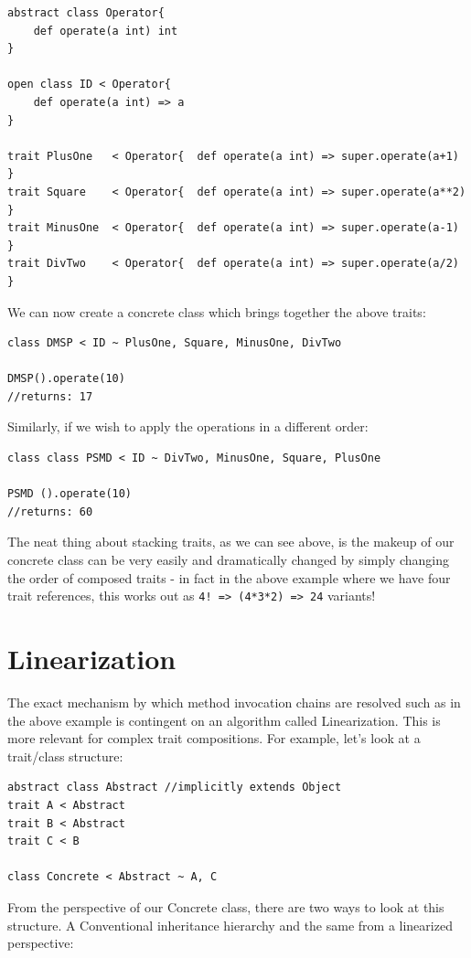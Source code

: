\documentclass[conc-doc]{subfiles}
\begin{document}
\begin{lstlisting}
abstract class Operator{
	def operate(a int) int
}

open class ID < Operator{
	def operate(a int) => a
}

trait PlusOne   < Operator{  def operate(a int) => super.operate(a+1) }
trait Square    < Operator{  def operate(a int) => super.operate(a**2) }
trait MinusOne  < Operator{  def operate(a int) => super.operate(a-1) }
trait DivTwo    < Operator{  def operate(a int) => super.operate(a/2) }
\end{lstlisting}

We can now create a concrete class which brings together the above traits:

\begin{lstlisting}
class DMSP < ID ~ PlusOne, Square, MinusOne, DivTwo

DMSP().operate(10)
//returns: 17
\end{lstlisting}

Similarly, if we wish to apply the operations in a different order:
\begin{lstlisting}
class class PSMD < ID ~ DivTwo, MinusOne, Square, PlusOne

PSMD ().operate(10)
//returns: 60
\end{lstlisting}

The neat thing about stacking traits, as we can see above, is the makeup of our concrete class can be very easily and dramatically changed by simply changing the order of composed traits - in fact in the above example where we have four trait references, this works out as \lstinline{4! => (4*3*2) => 24} variants!

\section{Linearization}
The exact mechanism by which method invocation chains are resolved such as in the above example is contingent on an algorithm called Linearization. This is more relevant for complex trait compositions. For example, let's look at a trait/class structure:

\begin{lstlisting}
abstract class Abstract //implicitly extends Object
trait A < Abstract
trait B < Abstract
trait C < B

class Concrete < Abstract ~ A, C
\end{lstlisting}

From the perspective of our Concrete class, there are two ways to look at this structure. A Conventional inheritance hierarchy and the same from a linearized perspective:
\end{document}
